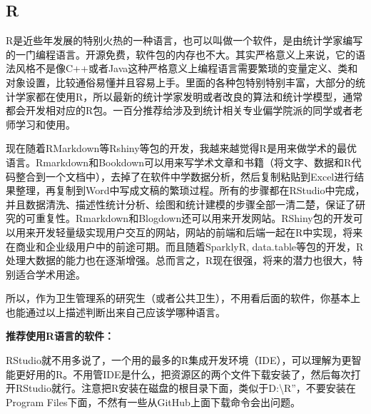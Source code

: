 \documentclass[11pt, a4paper]{article}
\begin{document}
\subsection{R}

R是近些年发展的特别火热的一种语言，也可以叫做一个软件，是由统计学家编写的一门编程语言。开源免费，软件包的内存也不大。其实严格意义上来说，它的语法风格不是像C++或者Java这种严格意义上编程语言需要繁琐的变量定义、类和对象设置，比较通俗易懂并且容易上手。里面的各种包特别特别丰富，大部分的统计学家都在使用R，所以最新的统计学家发明或者改良的算法和统计学模型，通常都会开发相对应的R包。一百分推荐给涉及到统计相关专业偏学院派的同学或者老师学习和使用。

现在随着RMarkdown等Rshiny等包的开发，我越来越觉得R是用来做学术的最优语言。Rmarkdown和Bookdown可以用来写学术文章和书籍（将文字、数据和R代码整合到一个文档中），去掉了在软件中学数据分析，然后复制粘贴到Excel进行结果整理，再复制到Word中写成文稿的繁琐过程。所有的步骤都在RStudio中完成，并且数据清洗、描述性统计分析、绘图和统计建模的步骤全部一清二楚，保证了研究的可重复性。Rmarkdown和Blogdown还可以用来开发网站。RShiny包的开发可以用来开发轻量级实现用户交互的网站，网站的前端和后端一起在R中实现，将来在商业和企业级用户中的前途可期。而且随着SparklyR, data.table等包的开发，R处理大数据的能力也在逐渐增强。总而言之，R现在很强，将来的潜力也很大，特别适合学术用途。

所以，作为卫生管理系的研究生（或者公共卫生），不用看后面的软件，你基本上也能通过以上描述判断出来自己应该学哪种语言。

\textbf{推荐使用R语言的软件：}

RStudio就不用多说了，一个用的最多的R集成开发环境（IDE），可以理解为更智能更好用的R。不用管IDE是什么，把资源区的两个文件下载安装了，然后每次打开RStudio就行。注意把R安装在磁盘的根目录下面，类似于D:\textbackslash R”，不要安装在Program Files下面，不然有一些从GitHub上面下载命令会出问题。
\end{document}
